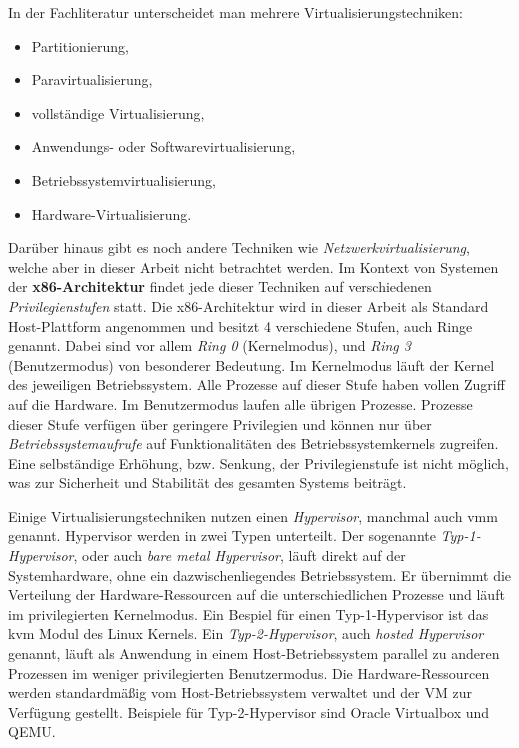 In der Fachliteratur\cite{BSKompakt_Virt}\cite{BSGK_RBrause} unterscheidet man
mehrere Virtualisierungstechniken:
\begin{itemize}
    \item Partitionierung,
    \item Paravirtualisierung,
    \item vollständige Virtualisierung,
    \item Anwendungs- oder Softwarevirtualisierung,
    \item Betriebssystemvirtualisierung,
    \item Hardware-Virtualisierung.
\end{itemize}
Darüber hinaus gibt es noch andere Techniken wie
\textit{Netzwerkvirtualisierung}, welche aber in dieser Arbeit nicht betrachtet
werden.
Im Kontext von Systemen der \textbf{x86-Architektur} findet jede dieser
Techniken auf verschiedenen \textit{Privilegienstufen} statt.
Die x86-Architektur wird in dieser Arbeit als Standard Host-Plattform
angenommen und besitzt 4 verschiedene Stufen, auch Ringe
genannt\cite{BSKompakt_Syscall}.
\newline
Dabei sind vor allem \textit{Ring 0} (Kernelmodus), und \textit{Ring 3}
(Benutzermodus) von besonderer Bedeutung.
Im Kernelmodus läuft der Kernel des jeweiligen Betriebssystem. Alle Prozesse
auf dieser Stufe haben vollen Zugriff auf die Hardware\cite{BSKompakt_Syscall}.
\newline
Im Benutzermodus laufen alle übrigen Prozesse.
Prozesse dieser Stufe verfügen über geringere Privilegien und können nur über
\textit{Betriebssystemaufrufe} auf Funktionalitäten des Betriebssystemkernels
zugreifen\cite{BSKompakt_Syscall}.
Eine selbständige Erhöhung, bzw. Senkung, der Privilegienstufe ist nicht
möglich, was zur Sicherheit und Stabilität des gesamten Systems beiträgt.


Einige Virtualisierungstechniken nutzen einen \textit{Hypervisor}, manchmal
auch \ac{vmm} genannt.
Hypervisor werden in zwei Typen unterteilt.
\newline
Der sogenannte \textit{Typ-1-Hypervisor}, oder auch \textit{bare metal
Hypervisor}, läuft direkt auf der Systemhardware, ohne ein dazwischenliegendes
Betriebssystem.
Er übernimmt die Verteilung der Hardware-Ressourcen auf die unterschiedlichen
Prozesse und läuft im privilegierten Kernelmodus\cite{BSKompakt_Syscall}.
Ein Bespiel für einen Typ-1-Hypervisor ist das \ac{kvm} Modul des Linux
Kernels.
\newline
Ein \textit{Typ-2-Hypervisor}, auch \textit{hosted Hypervisor} genannt, läuft
als Anwendung in einem Host-Betriebssystem parallel zu anderen Prozessen im
weniger privilegierten Benutzermodus\cite{BSKompakt_Virt}.
Die Hardware-Ressourcen werden standardmäßig vom Host-Betriebssystem verwaltet
und der VM zur Verfügung gestellt.
Beispiele für Typ-2-Hypervisor sind Oracle Virtualbox und QEMU.

